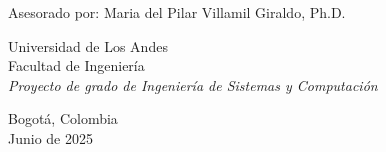 \begin{titlepage}

  \thispagestyle{empty}
  \centering
  \vspace*{-0.8cm}


  \vspace{1.5 cm}

  {\textbf \AuthorName \par}
  \vspace{1.5cm}
  {\normalsize Asesorado por: Maria del Pilar Villamil Giraldo, Ph.D. \par}
  \vspace{3.0cm}

  \par
  \vspace{3.0cm}

  { \normalsize Universidad de Los Andes\\
    Facultad de Ingeniería\\
    \vspace{1cm}
  \textit{Proyecto de grado de Ingeniería de Sistemas y Computación}\par}
  \vspace{1cm}

  {\normalsize Bogotá, Colombia\\Junio de 2025\par}

\end{titlepage}
\clearpage